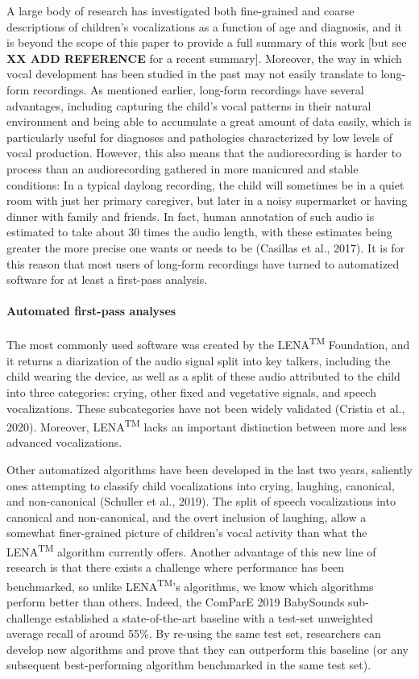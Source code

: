 \documentclass[english,,man]{apa6}
\begin{document}
A large body of research has investigated both fine-grained and coarse descriptions of children's vocalizations as a function of age and diagnosis, and it is beyond the scope of this paper to provide a full summary of this work {[}but see \textbf{XX ADD REFERENCE} for a recent summary{]}. Moreover, the way in which vocal development has been studied in the past may not easily translate to long-form recordings. As mentioned earlier, long-form recordings have several advantages, including capturing the child's vocal patterns in their natural environment and being able to accumulate a great amount of data easily, which is particularly useful for diagnoses and pathologies characterized by low levels of vocal production. However, this also means that the audiorecording is harder to process than an audiorecording gathered in more manicured and stable conditions: In a typical daylong recording, the child will sometimes be in a quiet room with just her primary caregiver, but later in a noisy supermarket or having dinner with family and friends. In fact, human annotation of such audio is estimated to take about 30 times the audio length, with these estimates being greater the more precise one wants or needs to be (Casillas et al., 2017). It is for this reason that most users of long-form recordings have turned to automatized software for at least a first-pass analysis.

\hypertarget{automated-first-pass-analyses}{%
\paragraph{Automated first-pass analyses}\label{automated-first-pass-analyses}}

The most commonly used software was created by the LENA\textsuperscript{TM} Foundation, and it returns a diarization of the audio signal split into key talkers, including the child wearing the device, as well as a split of these audio attributed to the child into three categories: crying, other fixed and vegetative signals, and speech vocalizations. These subcategories have not been widely validated (Cristia et al., 2020). Moreover, LENA\textsuperscript{TM} lacks an important distinction between more and less advanced vocalizations.

Other automatized algorithms have been developed in the last two years, saliently ones attempting to classify child vocalizations into crying, laughing, canonical, and non-canonical (Schuller et al., 2019). The split of speech vocalizations into canonical and non-canonical, and the overt inclusion of laughing, allow a somewhat finer-grained picture of children's vocal activity than what the LENA\textsuperscript{TM} algorithm currently offers. Another advantage of this new line of research is that there exists a challenge where performance has been benchmarked, so unlike LENA\textsuperscript{TM}'s algorithms, we know which algorithms perform better than others. Indeed, the ComParE 2019 BabySounds sub-challenge established a state-of-the-art baseline with a test-set unweighted average recall of around 55\%. By re-using the same test set, researchers can develop new algorithms and prove that they can outperform this baseline (or any subsequent best-performing algorithm benchmarked in the same test set).
\end{document}
